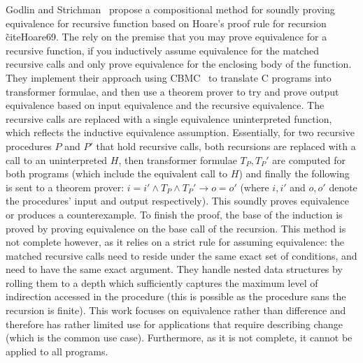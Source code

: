 Godlin and Strichman~\cite{GodlinStrichman09} propose a compositional method for soundly proving equivalence for recursive function based on Hoare's proof rule for recursion \~cite{Hoare69}. The rely on the premise that you may prove equivalence for a recursive function, if you inductively assume equivalence for the matched recursive calls and only prove equivalence for the enclosing body of the function. They implement their approach using CBMC~\cite{ClarkeKroening03} to translate C programs into transformer formulae, and then use a theorem prover to try and prove output equivalence based on input equivalence and the recursive equivalence. The recursive calls are replaced with a single equivalence uninterpreted function, which reflects the inductive equivalence assumption. Essentially, for two recursive procedures $P$ and $P'$ that hold recursive calls, both recursions are replaced with a call to an uninterpreted $H$, then transformer formulae $T_P,T_P'$ are computed for both programs (which include the equivalent call to $H$) and finally the following is sent to a theorem prover: $i = i' \wedge T_P \wedge T_P' \rightarrow o = o'$ (where $i,i'$ and $o,o'$ denote the procedures' input and output respectively). This soundly proves equivalence or produces a counterexample. To finish the proof, the base of the induction is proved by proving equivalence on the base call of the recursion. This method is not complete however, as it relies on a strict rule for assuming equivalence: the matched recursive calls need to reside under the same exact set of conditions, and need to have the same exact argument. They handle nested data structures by rolling them to a depth which sufficiently captures the maximum level of indirection accessed in the procedure (this is possible as the procedure sans the recursion is finite). This work focuses on equivalence rather than difference and therefore has rather limited use for applications that require describing change (which is the common use case). Furthermore, as it is not complete, it cannot be applied to all programs. 